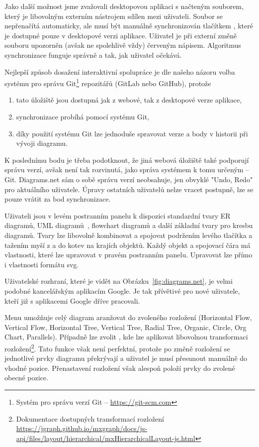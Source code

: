 Jako další možnost jsme zvažovali desktopovou aplikaci s načteným souborem, který je libovolným externím nástrojem sdílen mezi uživateli.
Soubor se nepřenačítá automaticky, ale musí být manuálně synchronizován tlačítkem , které je dostupné pouze v desktopové verzi aplikace.
Uživatel je při externí změně souboru upozorněn (avšak ne spolehlivě vždy) červeným nápisem.
Algoritmus synchronizace funguje správně a tak, jak uživatel očekává.

Nejlepší způsob dosažení interaktivní spolupráce je dle našeho názoru volba systému pro správu Git\footnote{Systém pro správu verzí Git -- \url{https://git-scm.com}} repozitářů (GitLab nebo GitHub), protože
\begin{enumerate}
  \item tato úložiště jsou dostupná jak z webové, tak z desktopové verze aplikace,
  \item synchronizace probíhá pomocí systému Git,
  \item díky použití systému Git lze jednoduše spravovat verze a body v historii při vývoji diagramu.
\end{enumerate}

K poslednímu bodu je třeba podotknout, že jiná webová úložiště také podporují správu verzí, avšak není tak rozvinutá, jako správa systémem k tomu určeným -- Git.
Diagrams.net sám o sobě správu verzí neobsahuje, jen obvyklé "Undo, Redo" pro aktuálního uživatele.
Úpravy ostatních uživatelů nelze vracet postupně, lze se pouze vrátit za bod synchronizace.

Uživateli jsou v levém postranním panelu k dispozici standardní tvary ER diagramů, UML diagramů~\cite{omg_uml_2017}, flowchart diagramů a další základní tvary pro kresbu diagramů.
Tvary lze libovolně kombinovat a spojovat podržením levého tlačítka a tažením myší z a do kotev na krajích objektů.
Každý objekt a spojovací čára má vlastnosti, které lze upravovat v pravém postranním panelu.
Upravovat lze přímo i vlastnosti formátu \acrshort{svg}.

Uživatelské rozhraní, které je vidět na Obrázku~\ref{fig:diagrams.net}, je velmi podobné kancelářským aplikacím Google.
Je tak přívětivé pro nové uživatele, kteří již s aplikacemi Google dříve pracovali.

Menu  umožňuje celý diagram aranžovat do zvoleného rozložení (Horizontal Flow, Vertical Flow, Horizontal Tree, Vertical Tree, Radial Tree, Organic, Circle, Org Chart, Parallels).
Případně lze zvolit , kde lze aplikovat libovolnou transformaci rozložení\footnote{Dokumentace dostupných transformací rozložení \url{https://jgraph.github.io/mxgraph/docs/js-api/files/layout/hierarchical/mxHierarchicalLayout-js.html}}.
Tato funkce však není perfektní, protože po změně rozložení se jednotlivé prvky diagramu překrývají a uživatel je musí přesunout manuálně do vhodné pozice.
Přenastavení rozložení však alespoň položí prvky do zvolené obecné pozice.

